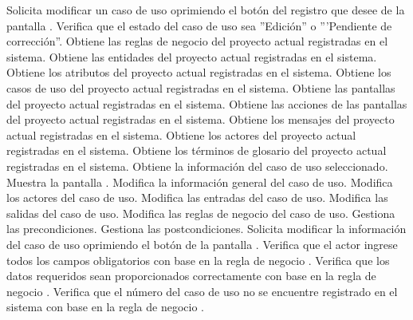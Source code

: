 	\begin{UCtrayectoria}
		\UCpaso[\UCactor] Solicita modificar un caso de uso oprimiendo el botón \editar del registro que desee de la pantalla .
		\UCpaso[\UCsist] Verifica que el estado del caso de uso sea ''Edición'' o '''Pendiente de corrección''. 
		\UCpaso[\UCsist] Obtiene las reglas de negocio del proyecto actual registradas en el sistema.
		\UCpaso[\UCsist] Obtiene las entidades del proyecto actual registradas en el sistema.
		\UCpaso[\UCsist] Obtiene los atributos del proyecto actual registradas en el sistema.
		\UCpaso[\UCsist] Obtiene los casos de uso del proyecto actual registradas en el sistema.
		\UCpaso[\UCsist] Obtiene las pantallas del proyecto actual registradas en el sistema.
		\UCpaso[\UCsist] Obtiene las acciones de las pantallas del proyecto actual registradas en el sistema.
		\UCpaso[\UCsist] Obtiene los mensajes del proyecto actual registradas en el sistema.
		\UCpaso[\UCsist] Obtiene los actores del proyecto actual registradas en el sistema.
		\UCpaso[\UCsist] Obtiene los términos de glosario del proyecto actual registradas en el sistema.
		\UCpaso[\UCsist] Obtiene la información del caso de uso seleccionado.
		\UCpaso[\UCsist] Muestra la pantalla .
		\UCpaso[\UCactor] Modifica la información general del caso de uso. \label{CU12.2-P14}
		\UCpaso[\UCactor] Modifica los actores del caso de uso.  \label{CU12.2-P15}
		\UCpaso[\UCactor] Modifica las entradas del caso de uso.   \label{CU12.2-P16}
		\UCpaso[\UCactor] Modifica las salidas  del caso de uso.  \label{CU12.2-P17}
		\UCpaso[\UCactor] Modifica las reglas de negocio del caso de uso.  \label{CU12.2-P18}
		\UCpaso[\UCactor] Gestiona las precondiciones. \label{CU12.2-P19}
		\UCpaso[\UCactor] Gestiona las postcondiciones. \label{CU12.2-P20}
		\UCpaso[\UCactor] Solicita modificar la información del caso de uso oprimiendo el botón  de la pantalla . \label{CU10.1-P5}  
		\UCpaso[\UCsist] Verifica que el actor ingrese todos los campos obligatorios con base en la regla de negocio . 
		\UCpaso[\UCsist] Verifica que los datos requeridos sean proporcionados correctamente con base en la regla de negocio .   
		\UCpaso[\UCsist] Verifica que el número del caso de uso no se encuentre registrado en el sistema con base en la regla de negocio . 

\end{UCtrayectoria}
